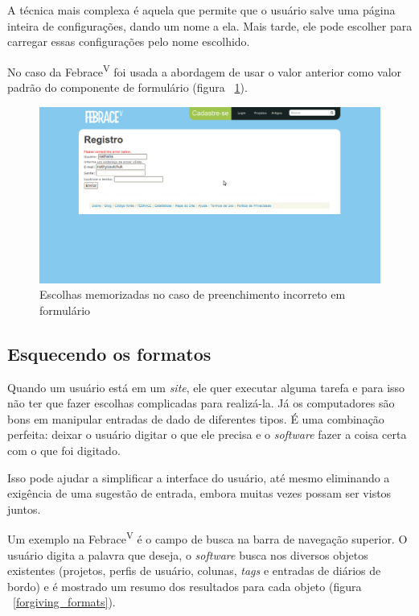 A técnica mais complexa é aquela que permite que o usuário salve uma página inteira de configurações, dando um nome a ela. Mais tarde, ele pode escolher para carregar essas configurações pelo nome escolhido.

No caso da Febrace\textsuperscript{V} foi usada a abordagem de usar o valor anterior como valor padrão do componente de formulário (figura ~\ref{remembered_choices}).

    \begin{figure}[h]
        \begin{center}
    \includegraphics[width=1.0\linewidth]{arquivos/remembered_choices.png}
        \end{center}
        \caption{Escolhas memorizadas no caso de preenchimento incorreto em formulário}
        \label{remembered_choices}
    \end{figure}

\subsection{Esquecendo os formatos}

Quando um usuário está em um \textit{site}, ele quer executar alguma tarefa e para isso não ter que fazer escolhas complicadas para realizá-la. Já os computadores são bons em manipular entradas de dado de diferentes tipos. É uma combinação perfeita: deixar o usuário digitar o que ele precisa e o \textit{software} fazer a coisa certa com o que foi digitado.

Isso pode ajudar a simplificar a interface do usuário, até mesmo eliminando a exigência de uma sugestão de entrada, embora muitas vezes possam ser vistos juntos.

Um exemplo na Febrace\textsuperscript{V} é o campo de busca na barra de navegação superior. O usuário digita a palavra que deseja, o \textit{software} busca nos diversos objetos existentes (projetos, perfis de usuário, colunas, \textit{tags} e entradas de diários de bordo) e é mostrado um resumo dos resultados para cada objeto (figura ~\ref{forgiving_formats}).

